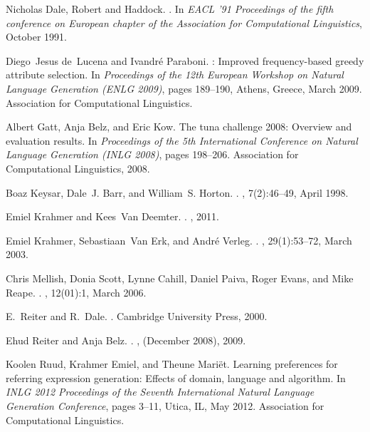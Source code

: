 \documentclass[a4paper,12pt]{article}
\begin{document}
\begin{thebibliography}{10}
Nicholas {Dale, Robert and Haddock}.
.
\newblock In {\em EACL '91 Proceedings of the fifth conference on European
  chapter of the Association for Computational Linguistics}, October 1991.

Diego~Jesus de~Lucena and Ivandr{\'e} Paraboni.
: Improved frequency-based greedy attribute selection.
\newblock In {\em Proceedings of the 12th European Workshop on Natural Language
  Generation (ENLG 2009)}, pages 189--190, Athens, Greece, March 2009.
  Association for Computational Linguistics.

Albert Gatt, Anja Belz, and Eric Kow.
\newblock The tuna challenge 2008: Overview and evaluation results.
\newblock In {\em Proceedings of the 5th International Conference on Natural
  Language Generation (INLG 2008)}, pages 198--206. Association for
  Computational Linguistics, 2008.

Boaz Keysar, Dale~J. Barr, and William~S. Horton.
.
, 7(2):46--49, April
  1998.

Emiel Krahmer and Kees~Van Deemter.
.
, 2011.

Emiel Krahmer, Sebastiaan~Van Erk, and Andr\'{e} Verleg.
.
, 29(1):53--72, March 2003.

Chris Mellish, Donia Scott, Lynne Cahill, Daniel Paiva, Roger Evans, and Mike
  Reape.
.
, 12(01):1, March 2006.

E.~Reiter and R.~Dale.
.
\newblock Cambridge University Press, 2000.

Ehud Reiter and Anja Belz.
.
, (December 2008), 2009.

Koolen Ruud, Krahmer Emiel, and Theune Mari\"{e}t.
\newblock Learning preferences for referring expression generation: Effects of
  domain, language and algorithm.
\newblock In {\em INLG 2012 Proceedings of the Seventh International Natural
  Language Generation Conference}, pages 3--11, Utica, IL, May 2012.
  Association for Computational Linguistics.


\end{thebibliography}
\end{document}
